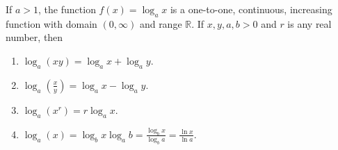 \begin{frame}
\begin{theorem}
If $a > 1$, the function $f(x) = \log_a x$ is a one-to-one, continuous, increasing function with domain $(0, \infty )$ and range $\mathbb{R}$.  If $x, y, a, b > 0$ and $r$ is any real number, then
\begin{enumerate}
\item  $\log_a (xy) = \log_a x + \log_a y$.
\item  $\log_a \left( \frac{x}{y}\right) = \log_a x - \log_a y$.
\item  $\log_a (x^r) = r\log_a x$.
\item  $\log_{a}(x)=\log_b x \log_{a} b=\frac{\log_b x}{\log_{b} a}=  \frac{\ln x}{\ln a}$.
\end{enumerate}
\end{theorem}

\end{frame}
